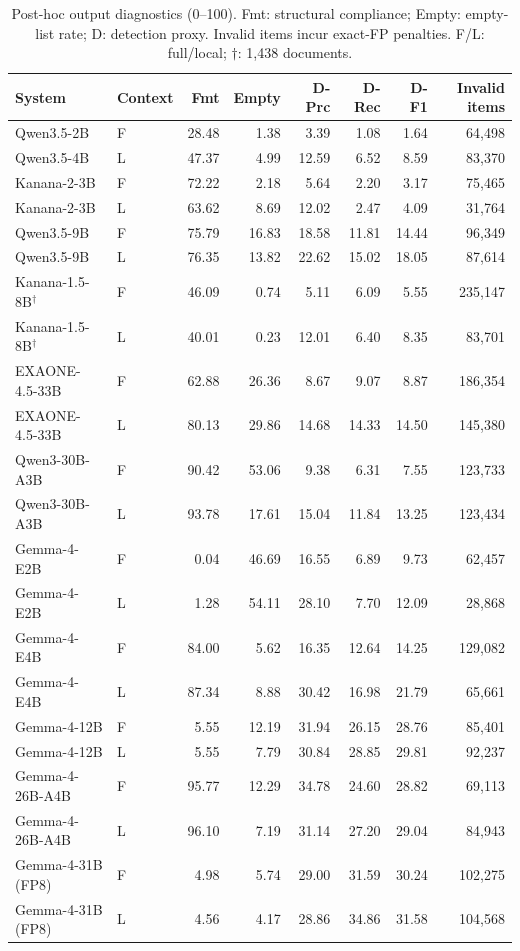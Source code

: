 \begin{table}[t]
\caption{Post-hoc output diagnostics (0--100). Fmt: structural compliance; Empty: empty-list rate; D: detection proxy. Invalid items incur exact-FP penalties. F/L: full/local; $\dagger$: 1,438 documents.}
\label{tab:response-diagnostics}
\small
\begin{tabular*}{\textwidth}{@{\extracolsep{\fill}}llrrrrrr@{}}
\toprule
System & Context & Fmt & Empty & D-Prc & D-Rec & D-F1 & Invalid items \\
\midrule
Qwen3.5-2B & F & 28.48 & 1.38 & 3.39 & 1.08 & 1.64 & 64,498 \\
Qwen3.5-4B & L & 47.37 & 4.99 & 12.59 & 6.52 & 8.59 & 83,370 \\
Kanana-2-3B & F & 72.22 & 2.18 & 5.64 & 2.20 & 3.17 & 75,465 \\
Kanana-2-3B & L & 63.62 & 8.69 & 12.02 & 2.47 & 4.09 & 31,764 \\
Qwen3.5-9B & F & 75.79 & 16.83 & 18.58 & 11.81 & 14.44 & 96,349 \\
Qwen3.5-9B & L & 76.35 & 13.82 & 22.62 & 15.02 & 18.05 & 87,614 \\
Kanana-1.5-8B$^\dagger$ & F & 46.09 & 0.74 & 5.11 & 6.09 & 5.55 & 235,147 \\
Kanana-1.5-8B$^\dagger$ & L & 40.01 & 0.23 & 12.01 & 6.40 & 8.35 & 83,701 \\
EXAONE-4.5-33B & F & 62.88 & 26.36 & 8.67 & 9.07 & 8.87 & 186,354 \\
EXAONE-4.5-33B & L & 80.13 & 29.86 & 14.68 & 14.33 & 14.50 & 145,380 \\
Qwen3-30B-A3B & F & 90.42 & 53.06 & 9.38 & 6.31 & 7.55 & 123,733 \\
Qwen3-30B-A3B & L & 93.78 & 17.61 & 15.04 & 11.84 & 13.25 & 123,434 \\
Gemma-4-E2B & F & 0.04 & 46.69 & 16.55 & 6.89 & 9.73 & 62,457 \\
Gemma-4-E2B & L & 1.28 & 54.11 & 28.10 & 7.70 & 12.09 & 28,868 \\
Gemma-4-E4B & F & 84.00 & 5.62 & 16.35 & 12.64 & 14.25 & 129,082 \\
Gemma-4-E4B & L & 87.34 & 8.88 & 30.42 & 16.98 & 21.79 & 65,661 \\
Gemma-4-12B & F & 5.55 & 12.19 & 31.94 & 26.15 & 28.76 & 85,401 \\
Gemma-4-12B & L & 5.55 & 7.79 & 30.84 & 28.85 & 29.81 & 92,237 \\
Gemma-4-26B-A4B & F & 95.77 & 12.29 & 34.78 & 24.60 & 28.82 & 69,113 \\
Gemma-4-26B-A4B & L & 96.10 & 7.19 & 31.14 & 27.20 & 29.04 & 84,943 \\
Gemma-4-31B (FP8) & F & 4.98 & 5.74 & 29.00 & 31.59 & 30.24 & 102,275 \\
Gemma-4-31B (FP8) & L & 4.56 & 4.17 & 28.86 & 34.86 & 31.58 & 104,568 \\
\bottomrule
\end{tabular*}
\end{table}

